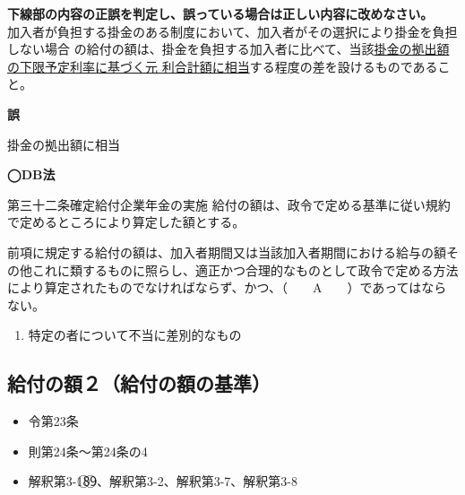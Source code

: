 \begin{truefalse}[年金1 2020 問題1(3)\textcircled{2}]
    \textbf{下線部の内容の正誤を判定し、誤っている場合は正しい内容に改めなさい。}
  \\

  加入者が負担する掛金のある制度において、加入者がその選択により掛金を負担しない場合
の給付の額は、掛金を負担する加入者に比べて、当該\underline{掛金の拠出額の下限予定利率に基づく元
利合計額に相当}する程度の差を設けるものであること。
\end{truefalse}

\begin{answerbox}
  \textbf{誤}

  掛金の拠出額に相当
\end{answerbox}

\begin{fillblank}[年金1 2019 問題1(1)A]
  \noindent \textbf{◯DB法}
  \begin{lawstructure}
    \begin{lawarticle}{第三十二条}{確定給付企業年金の実施}
      給付の額は、政令で定める基準に従い規約で定めるところにより算定した額とする。

      前項に規定する給付の額は、加入者期間又は当該加入者期間における給与の額その他これに類するものに照らし、適正かつ合理的なものとして政令で定める方法により算定されたものでなければならず、かつ、（　　A　　）であってはならない。
    \end{lawarticle}
  \end{lawstructure}  
\end{fillblank}

\begin{answerbox}
  \begin{enumerate}[A:]
    \item 特定の者について不当に差別的なもの
  \end{enumerate}
\end{answerbox}

\newpage

\subsection{給付の額２（給付の額の基準）}


\begin{InyouJobunbox}
  \begin{itemize}
    \item 令第23条
    \item 則第24条〜第24条の4
    \item 解釈第3-1\textcircled{8}\textcircled{9}、解釈第3-2、解釈第3-7、解釈第3-8
  \end{itemize}
\end{InyouJobunbox}

